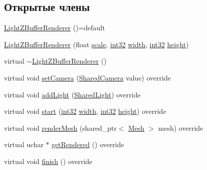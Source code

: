 \subsection*{Открытые члены}
\begin{DoxyCompactItemize}
\item 
\hyperlink{class_light_z_buffer_renderer_a6b48dd8c2782308bd742cd43f4185a53}{Light\+Z\+Buffer\+Renderer} ()=default
\item 
\hyperlink{class_light_z_buffer_renderer_ae0d09c94784fc721d926c93a87907a0c}{Light\+Z\+Buffer\+Renderer} (float \hyperlink{class_renderer_aeab228a83d206c55fc73c7a14a0f0761}{scale}, \hyperlink{number_8h_a43d43196463bde49cb067f5c20ab8481}{int32} \hyperlink{class_renderer_ada813defebef120813571bfb6053e88f}{width}, \hyperlink{number_8h_a43d43196463bde49cb067f5c20ab8481}{int32} \hyperlink{class_renderer_ab2e154b790a2d31603f147510c261ac2}{height})
\item 
virtual \hyperlink{class_light_z_buffer_renderer_a8bc0f947c608e08a7094be1b02a27e13}{$\sim$\+Light\+Z\+Buffer\+Renderer} ()
\item 
virtual void \hyperlink{class_light_z_buffer_renderer_acc0d204a38cc6105a7c258b49e5197a4}{set\+Camera} (\hyperlink{camera_8h_a01f929aec8e912be07dca2c1f8d00f67}{Shared\+Camera} value) override
\item 
virtual void \hyperlink{class_light_z_buffer_renderer_a73f101ddbdbb27eb19d6ee719da9bf9a}{add\+Light} (\hyperlink{light_8h_ae1ec32369be93ce20c1e9047a8d388c0}{Shared\+Light}) override
\item 
virtual void \hyperlink{class_light_z_buffer_renderer_a431be9dc219e4d2706c95ada2aca8af6}{start} (\hyperlink{number_8h_a43d43196463bde49cb067f5c20ab8481}{int32} \hyperlink{class_renderer_ada813defebef120813571bfb6053e88f}{width}, \hyperlink{number_8h_a43d43196463bde49cb067f5c20ab8481}{int32} \hyperlink{class_renderer_ab2e154b790a2d31603f147510c261ac2}{height}) override
\item 
virtual void \hyperlink{class_light_z_buffer_renderer_a258b9e41e648b8f6393a39d2935d4d42}{render\+Mesh} (shared\+\_\+ptr$<$ \hyperlink{class_mesh}{Mesh} $>$ mesh) override
\item 
virtual uchar $\ast$ \hyperlink{class_light_z_buffer_renderer_a7e712d8d1b3a7be674efb620ba3ff0ef}{get\+Rendered} () override
\item 
virtual void \hyperlink{class_light_z_buffer_renderer_ad8084c0d5f0b4555900efbeaa81ec066}{finish} () override
\end{DoxyCompactItemize}
